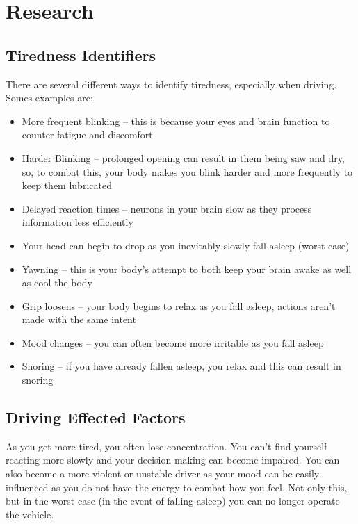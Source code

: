 \chapter*{Research}

\section{Tiredness Identifiers}
There are several different ways to identify tiredness, especially when driving. Somes examples are:
\begin{itemize}
    \item More frequent blinking – this is because your eyes and brain function to counter fatigue and discomfort
    \item Harder Blinking – prolonged opening can result in them being saw and dry, so, to combat this, your body
    makes you blink harder and more frequently to keep them lubricated
    \item Delayed reaction times – neurons in your brain slow as they process information less efficiently
    \item Your head can begin to drop as you inevitably slowly fall asleep (worst case)
    \item Yawning – this is your body’s attempt to both keep your brain awake as well as cool the body
    \item Grip loosens – your body begins to relax as you fall asleep, actions aren’t made with the same intent
    \item Mood changes – you can often become more irritable as you fall asleep
    \item Snoring – if you have already fallen asleep, you relax and this can result in snoring
\end{itemize}

\section{Driving Effected Factors}
As you get more tired, you often lose concentration. You can’t find yourself reacting more slowly and your decision
making can become impaired. You can also become a more violent or unstable driver as your mood can be easily influenced
as you do not have the energy to combat how you feel. Not only this, but in the worst case (in the event of falling
asleep) you can no longer operate the vehicle.

